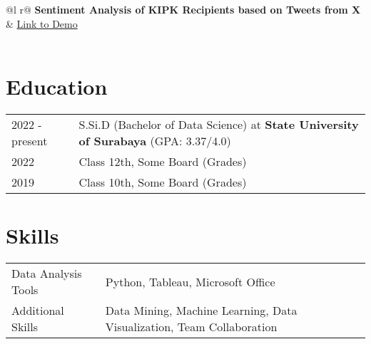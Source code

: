 \documentclass[a4paper,12pt]{article}
\begin{document}
\begin{tabularx}{\linewidth}{ @{}l r@{} }
\textbf{Sentiment Analysis of KIPK Recipients based on Tweets from X} & \hfill \href{https://github.com/rizky-22017-mhs-unesa-ac-id/Sentiment-Analysis-of-KIPK-Recipients-based-on-Tweets-from-X}{Link to Demo} \\[3.75pt]
 \\
\end{tabularx}

\section{Education}
\begin{tabularx}{\linewidth}{@{}l X@{}}	
2022 - present & S.Si.D (Bachelor of Data Science) at \textbf{State University of Surabaya} \hfill \normalsize (GPA: 3.37/4.0) \\ 

2022 & Class 12th, Some Board \hfill  (Grades) \\

2019 & Class 10th, Some Board \hfill  (Grades) \\
\end{tabularx}


\section{Skills}
\begin{tabularx}{\linewidth}{@{}l X@{}}
Data Analysis Tools &  \normalsize{Python, Tableau, Microsoft Office} \\
Additional Skills  &  \normalsize{Data Mining, Machine Learning, Data Visualization, Team Collaboration} \\  
\end{tabularx}

\vfill
{}
\end{document}
